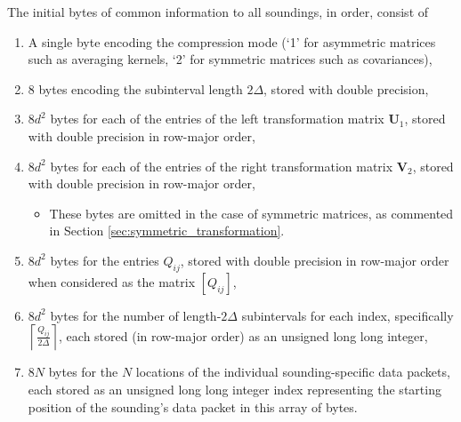 \documentclass{article}
\begin{document}
The initial bytes of common information to all soundings, in order, consist of 
\begin{enumerate} 
\item A single byte encoding the compression mode (`1' for asymmetric matrices such as averaging kernels, `2' for symmetric matrices such as covariances), 
\item 8 bytes encoding the subinterval length $2 \Delta$, stored with double precision, 
\item 8$d^2$ bytes for each of the entries of the left transformation matrix $\mathbf{U}_1$, stored with double precision in row-major order, 
\item 8$d^2$ bytes for each of the entries of the right transformation matrix $\mathbf{V}_2$, stored with double precision in row-major order, 
\begin{itemize} 
\item These bytes are omitted in the case of symmetric matrices, as commented in Section \ref{sec:symmetric_transformation}. 
\end{itemize} 
\item 8$d^2$ bytes for the entries $Q_{ij}$, stored with double precision in row-major order when considered as the matrix $[Q_{ij}]$, 
\item 8$d^2$ bytes for the number of length-$2 \Delta$ subintervals for each index, specifically $\left \lceil \frac{Q_{ij}}{2 \Delta} \right \rceil$, each stored (in row-major order) as an unsigned long long integer, 
\item 8$N$ bytes for the $N$ locations of the individual sounding-specific data packets, each stored as an unsigned long long integer index representing the starting position of the sounding's data packet in this array of bytes. \label{item:sounding_data_location} 
\end{enumerate} 
\end{document}
